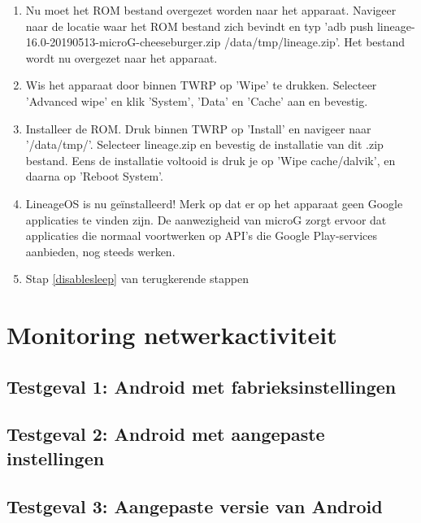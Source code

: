 \begin{enumerate}
    \item Nu moet het ROM bestand overgezet worden naar het apparaat. Navigeer naar de locatie waar het ROM bestand zich bevindt en typ 'adb push lineage-16.0-20190513-microG-cheeseburger.zip /data/tmp/lineage.zip'. Het bestand wordt nu overgezet naar het apparaat.
    \item Wis het apparaat door binnen TWRP op 'Wipe' te drukken. Selecteer 'Advanced wipe' en klik 'System', 'Data' en 'Cache' aan en bevestig.
    \item Installeer de ROM. Druk binnen TWRP op 'Install' en navigeer naar '/data/tmp/'. Selecteer lineage.zip en bevestig de installatie van dit .zip bestand. Eens de installatie voltooid is druk je op 'Wipe cache/dalvik', en daarna op 'Reboot System'.
    \item 
    LineageOS is nu geïnstalleerd! Merk op dat er op het apparaat geen Google applicaties te vinden zijn. De aanwezigheid van microG zorgt ervoor dat applicaties die normaal voortwerken op API's die Google Play-services aanbieden, nog steeds werken.
    \item Stap \ref{disablesleep} van terugkerende stappen
\end{enumerate}

\section{Monitoring netwerkactiviteit}

\subsection{Testgeval 1: Android met fabrieksinstellingen}

\subsection{Testgeval 2: Android met aangepaste instellingen}

\subsection{Testgeval 3: Aangepaste versie van Android}